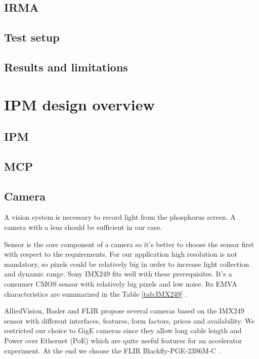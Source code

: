 \begin{refsection}
  \subsection{IRMA}
  \cite{Chaumont1981}
  
  \subsection{Test setup}
  \cite{advacam2019}
  \cite{Kraus2011}

  
  \subsection{Results and limitations}
  

  \section{IPM design overview}
  \subsection{IPM}
  \subsection{MCP}
  
  \subsection{Camera}
  A vision system is necessary to record light from the phosphorus screen.
  A camera with a lens should be sufficient in our case.

  Sensor is the core component of a camera so it's better to choose the sensor first with respect to the requirements.
  For our application high resolution is not mandatory, so pixels could be relatively big in order to increase light collection and dynamic range.
  Sony IMX249 fits well with these prerequisites. It's a consumer CMOS sensor with relatively big pixels and low noise.
  Its EMVA characteristics are summarized in the Table \ref{tab:IMX249} \cite{emva2010}.
  

  AlliedVision, Basler and FLIR propose several cameras based on the IMX249 sensor with different interfaces, features, form factors, prices and availability.
  We restricted our choice to GigE cameras since they allow long cable length and Power over Ethernet (PoE) which are quite useful features for an accelerator experiment.
  At the end we choose the FLIR Blackfly-PGE-23S6M-C \cite{blackfly2019}.


\end{refsection}
